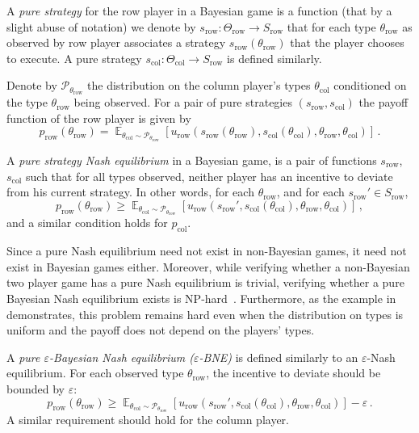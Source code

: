 \documentclass[10pt]{article}
\theoremstyle{definition}
\numberwithin{equation}{section}
\newcommand{\eps}{\varepsilon}
\DeclareMathOperator*{\E}{\mathbb{E}}
\newcommand{\cclass}[1]{\textsf{#1}}
\newcommand{\Ta}{\Theta}
\newcommand{\ta}{\theta}
\newcommand{\ra}{\rightarrow}
\newcommand{\cP}{{\mathcal P}}
\begin{document}
A \emph{pure strategy} for the row player  in a Bayesian game is a function (that by a slight abuse of notation) we denote 
by $s_{\mathrm{row}}:\Ta_{\mathrm{row}}\ra S_{\mathrm{row}}$ that for each type $\ta_{\mathrm{row}}$ as observed by row player associates a strategy $s_{\mathrm{row}}(\ta_{\mathrm{row}})$
that the player chooses to execute. A pure strategy $s_\mathrm{col}:\Ta_\mathrm{col}\ra S_{\mathrm{row}}$ is defined similarly. 

Denote by $\cP_{\ta_{\mathrm{row}}}$ the distribution on the column player's types $\ta_\mathrm{col}$ conditioned on the type $\ta_{\mathrm{row}}$ being observed. 
For a pair of pure strategies $(s_{\mathrm{row}},s_\mathrm{col})$ the payoff function of the row player  is given by 
$$
p_{\mathrm{row}}(\ta_{\mathrm{row}}) = \E_{\ta_\mathrm{col}\sim \cP_{\ta_{\mathrm{row}}}} [ u_{\mathrm{row}} ( s_{\mathrm{row}}(\ta_{\mathrm{row}}), s_\mathrm{col}(\ta_\mathrm{col}), \ta_{\mathrm{row}}, \ta_\mathrm{col})]\,. 
$$

A \emph{pure strategy Nash equilibrium} in a Bayesian game, is a pair of functions $s_{\mathrm{row}}$, $s_\mathrm{col}$ such that for all types
observed, neither player has an incentive to deviate from his current strategy. In other words, for each $\ta_{\mathrm{row}}$, and 
for each $s_{\mathrm{row}}'\in S_{\mathrm{row}}$, 
$$
p_{\mathrm{row}}(\ta_{\mathrm{row}}) \ge \E_{\ta_\mathrm{col}\sim \cP_{\ta_{\mathrm{row}}}} [u_{\mathrm{row}} ( s_{\mathrm{row}}', s_\mathrm{col}(\ta_\mathrm{col}), \ta_{\mathrm{row}}, \ta_\mathrm{col})]\,,
$$
and a similar condition holds for $p_\mathrm{col}$. 

Since a pure Nash equilibrium need not exist in non-Bayesian games, it
need not exist in Bayesian games either. Moreover, while verifying
whether a non-Bayesian two player game has a pure Nash equilibrium is
trivial, verifying whether a pure Bayesian Nash equilibrium exists is
\cclass{NP}-hard~\cite{CS08}. Furthermore, as the example in~\cite{CS08}
demonstrates, this problem remains hard even when the distribution on
types is uniform and the payoff does not depend on the players' types.

A \emph{pure  $\eps$-Bayesian Nash equilibrium ($\eps$-BNE)} is defined similarly to an $\eps$-Nash equilibrium. 
For each observed type $\ta_{\mathrm{row}}$, the incentive to deviate should be bounded by $\eps$:
$$
p_{\mathrm{row}}(\ta_{\mathrm{row}}) \ge \E_{\ta_\mathrm{col}\sim \cP_{\ta_{\mathrm{row}}}} [u_{\mathrm{row}} ( s_{\mathrm{row}}', s_\mathrm{col}(\ta_\mathrm{col}), \ta_{\mathrm{row}}, \ta_\mathrm{col})]-\eps\,.
$$
A similar requirement should hold for the column player. 
\end{document}
